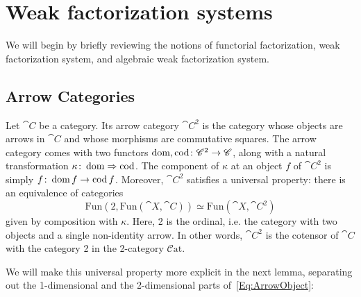
\chapter{Weak factorization systems}\label{Ch:Wfs}

We will begin by briefly reviewing the notions of functorial factorization, weak factorization system, and algebraic weak factorization system. 

\section{Arrow Categories}

Let $\cat{C}$ be a category. Its arrow category $\cat{C}^2$ is the category whose objects are arrows in $\cat{C}$ and whose morphisms are commutative squares. The arrow category comes with two functors $\operatorname{dom},\operatorname{cod}\colon \mathscr{C}^2\to\mathscr{C}$, along with a natural transformation $\kappa\colon\operatorname{dom}\Rightarrow\operatorname{cod}$. The component of $\kappa$ at an object $f$ of $\cat{C}^2$ is simply $f\colon\operatorname{dom} f\to\operatorname{cod} f$. Moreover, $\cat{C}^2$ satisfies a universal property: there is an equivalence of categories
\begin{equation}\label{Eq:ArrowObject}
	\mathrm{Fun}(2,\mathrm{Fun}(\cat{X},\cat{C}))\simeq\mathrm{Fun}(\cat{X},\cat{C}^2)
\end{equation}
given by composition with $\kappa$. Here, 2 is the ordinal, i.e. the category with two objects and a single non-identity arrow. In other words, $\cat{C}^2$ is the cotensor of $\cat{C}$ with the category 2 in the 2-category $\mathcal{C}\mathrm{at}$.

We will make this universal property more explicit in the next lemma, separating out the 1-dimensional and the 2-dimensional parts of~\eqref{Eq:ArrowObject}:

